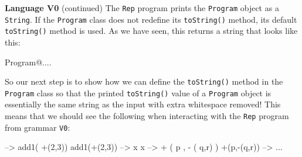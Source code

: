 \begin{minipage}[t]{\sw}
\slidenumber
\LARGE
{\bf Language V0} (continued)\exx
The \verb'Rep' program prints the \verb'Program' object as a \verb'String'.
If the \verb'Program' class does not redefine its \verb'toString()' method,
its default \verb'toString()' method is used.
As we have seen, this returns a string that looks like this:
\begin{qv}
Program@....
\end{qv}
So our next step is to show how we can define the \verb'toString()' method
in the \verb'Program' class
so that the printed \verb'toString()' value of a \verb'Program' object
is essentially the same string as the input
with extra whitespace removed!\exx
This means that we should see the following when interacting
with the \verb'Rep' program from grammar \verb'V0':
\begin{qv}
--> add1( +(2,3))
add1(+(2,3))
--> x
x
--> +  ( p  ,  - ( q,r)  )
+(p,-(q,r))
--> ...
\end{qv}
\end{minipage}
